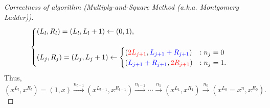 \documentclass[12pt,openany]{book}
\theoremstyle{definition}
\begin{document}
\begin{proof}[Correctness of algorithm \textnormal{(Multiply-and-Square Method (a.k.a. Montgomery Ladder))}]
\[		\begin{cases}
		(L_l,R_l)=(L_l,L_l+1)\leftarrow (0,1),\\\\
		(L_j,R_j)=(L_j,L_j+1)\leftarrow\begin{cases}
		(\textcolor{red}{2L_{j+1}},\textcolor{blue}{L_{j+1}+R_{j+1}}) &: n_j=0\\
		(\textcolor{blue}{L_{j+1}+R_{j+1}},\textcolor{red}{2R_{j+1}}) &: n_j=1.
		\end{cases}
		\end{cases}
		\]
		Thus, \[
		(x^{L_l},x^{R_l})=(1,x)\xrightarrow{n_{l-1}}(x^{L_{l-1}},x^{R_{l-1}})\xrightarrow{n_{l-2}}\cdots\xrightarrow{n_{1}}(x^{L_1},x^{R_1})\xrightarrow{n_0}(x^{L_0}=x^n,x^{R_0}).
		\]
	\end{proof}
	\vspace{8pt}
\end{document}

